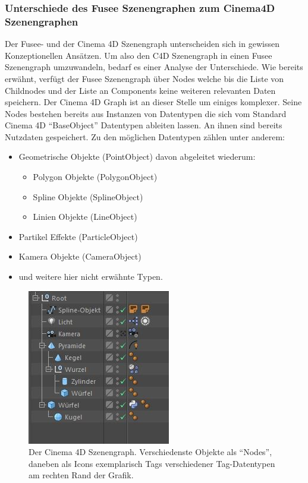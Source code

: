 \documentclass[pagesize, paper=a4, fontsize=12pt, titlepage=true, headings=small, headnosepline, abstractoff, liststotoc, nochapterprefix, plainheadsepline, twoside]{scrreprt}
\begin{document}
\subsubsection{Unterschiede des Fusee Szenengraphen zum Cinema4D Szenengraphen}
Der Fusee- und der Cinema 4D Szenengraph unterscheiden sich in gewissen Konzeptionellen Ansätzen. Um also den C4D Szenengraph in einen Fusee Szenengraph umzuwandeln, bedarf es einer Analyse der Unterschiede.
Wie bereits erwähnt, verfügt der Fusee Szenengraph über Nodes welche bis die Liste von Childnodes und der Liste an Components keine weiteren relevanten Daten speichern. Der Cinema 4D Graph ist an dieser Stelle um einiges komplexer. Seine Nodes bestehen bereits aus Instanzen von Datentypen die sich vom Standard Cinema 4D “BaseObject” Datentypen ableiten lassen. An ihnen sind bereits Nutzdaten gespeichert. Zu den möglichen Datentypen zählen unter anderem:
\begin{itemize}
\item Geometrische Objekte (PointObject) davon abgeleitet wiederum:
	\begin{itemize}
	\item Polygon Objekte (PolygonObject)
	\item Spline Objekte (SplineObject)
	\item Linien Objekte (LineObject)
	\end{itemize}
\item Partikel Effekte (ParticleObject)
\item Kamera Objekte (CameraObject)
\item und weitere hier nicht erwähnte Typen.
\end{itemize}

\begin{figure}[ht]
	\centering
	\includegraphics{Bilder/c4d_Szenengraph_Vgl.jpg}
	\caption{Der Cinema 4D Szenengraph. Verschiedenste Objekte als “Nodes”, daneben als Icons exemplarisch Tags verschiedener Tag-Datentypen am rechten Rand der Grafik.}
	\label{Cinema4dSzenenGraph}
\end{figure}
\end{document}
